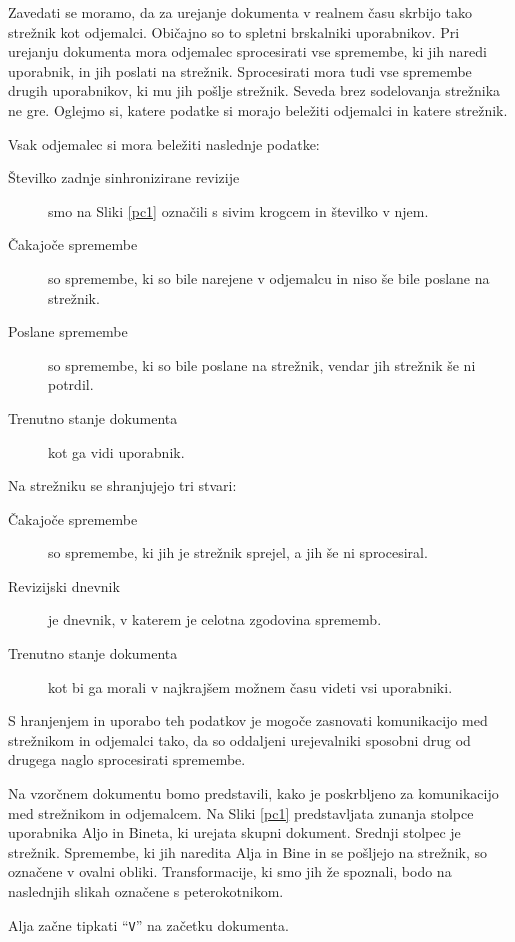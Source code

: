 \documentclass[a4paper, 12pt, twoside]{book}
\begin{document}
Zavedati se moramo, da za urejanje dokumenta v realnem času skrbijo tako strežnik kot odjemalci. Običajno so to spletni brskalniki uporabnikov. Pri urejanju dokumenta mora odjemalec sprocesirati vse spremembe, ki jih naredi uporabnik, in jih poslati na strežnik. Sprocesirati mora tudi vse spremembe drugih uporabnikov, ki mu jih pošlje strežnik. Seveda brez sodelovanja strežnika ne gre. Oglejmo si, katere podatke si morajo beležiti odjemalci in katere strežnik.

Vsak odjemalec si mora beležiti naslednje podatke:
\begin{description}
	\item[Številko zadnje sinhronizirane revizije] smo na Sliki \ref{pc1} označili s sivim krogcem in številko v njem.
	\item[Čakajoče spremembe] so spremembe, ki so bile narejene v odjemalcu in niso še bile poslane na strežnik.
	\item[Poslane spremembe] so spremembe, ki so bile poslane na strežnik, vendar jih strežnik še ni potrdil.
	\item[Trenutno stanje dokumenta] kot ga vidi uporabnik.
\end{description}

Na strežniku se shranjujejo tri stvari:
\begin{description}
	\item[Čakajoče spremembe] so spremembe, ki jih je strežnik sprejel, a jih še ni sprocesiral.
	\item[Revizijski dnevnik] je dnevnik, v katerem je celotna zgodovina sprememb.
	\item[Trenutno stanje dokumenta] kot bi ga morali v najkrajšem možnem času videti vsi uporabniki.
\end{description}

S hranjenjem in uporabo teh podatkov je mogoče zasnovati komunikacijo med strežnikom in odjemalci tako, da so oddaljeni urejevalniki sposobni drug od drugega naglo sprocesirati spremembe.

Na vzorčnem dokumentu bomo predstavili, kako je poskrbljeno za komunikacijo med strežnikom in odjemalcem. Na Sliki \ref{pc1} predstavljata zunanja stolpce uporabnika Aljo in Bineta, ki urejata skupni dokument. Srednji stolpec je strežnik. Spremembe, ki jih naredita Alja in Bine in se pošljejo na strežnik, so označene v ovalni obliki. Transformacije, ki smo jih že spoznali, bodo na naslednjih slikah označene s peterokotnikom.

Alja začne tipkati “{\tt V}” na začetku dokumenta.
\end{document}
